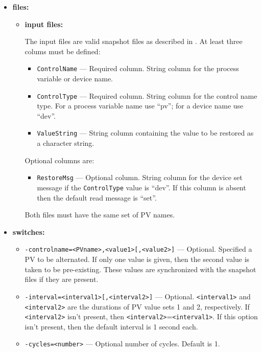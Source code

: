 \begin{itemize}
\item {\bf files:}
\begin{itemize}
\item {\bf input files:}\par
The input files are valid snapshot files as described in . At least three
colums must be defined:
\begin{itemize}
        \item {\tt ControlName} --- Required column. String column for the process variable or device name.
        \item {\tt ControlType} --- Required column. String column for the control name type. For a 
                process variable name use ``pv''; for a device name use ``dev''.
        \item {\tt ValueString} --- String column containing the value to be restored as a character string.
\end{itemize}
Optional columns are:
\begin{itemize}
        \item {\tt RestoreMsg} --- Optional column. String column for the device set message if 
                the {\tt ControlType} value is ``dev''.
                If this column is absent then the default read message is ``set''.
\end{itemize}
        Both files must have the same set of PV names.
\end{itemize}
%
\item {\bf switches:}
%
%
    \begin{itemize}
%
%
        \item {\tt -controlname=<PVname>,<value1>[,<value2>]} --- Optional. Specified a PV to be 
                alternated. If only one value is given, then the second value
                is taken to be pre-existing. These values are synchronized with
                the snapshot files if they are present.
        \item {\tt -interval=<interval1>[,<interval2>]} ---  Optional. \verb+<interval1>+ and \verb+<interval2>+
                 are the durations of PV value sets 1 and 2, respectively.
                 If \verb+<interval2>+ isn't present, then \verb+<interval2>+=\verb+<interval1>+.
                 If this option isn't present, then the default interval is 1 second each.
        \item {\tt -cycles=<number>} --- Optional number of cycles. Default is 1.

\end{itemize}
\end{itemize}
